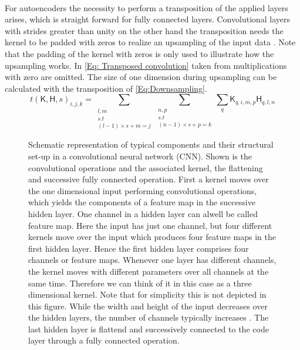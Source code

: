 \\
For autoencoders the necessity to perform a transposition of the applied layers arises, which is straight forward for fully connected layers. Convolutional layers with strides greater than unity on the other hand  the transposition needs the kernel to be padded with zeros to realize an upsampling of the input data \cite{dumoulin2018guide}. Note that the padding of the kernel with zeros is only used to illustrate how the upsampling works. In \cref{Eq: Transposed convolution} taken from \cite{Goodfellow} multiplications with zero are omitted. The size of one dimension during upsampling can be calculated with the transposition of \cref{Eq:Downsampling}.
\begin{equation}\label{Eq: Transposed convolution}
	t(\mathsf{K},\mathsf{H},s)_{i,j,k} = \sum_{\substack{l,m\\s.t\\(l-1)\times s+m=j}}
												  \sum_{\substack{n,p\\s.t\\(n-1)\times s+p=k}}
												  \sum_q \mathsf{K}_{q,i,m,p}\mathsf{H}_{q,l,n} 
\end{equation}
\begin{figure}
	\centering
	
	\label{Fig: Kernel}
	\caption{\footnotesize Schematic representation of typical components and their structural set-up in a convolutional neural network (CNN). Shown is the convolutional operations and the associated kernel, the flattening and successive fully connected operation. First a kernel moves over the one dimensional input performing convolutional operations, which yields the components of a feature map in the successive hidden layer. One channel in a hidden layer can alwell be called feature map. Here the input has just one channel, but four different kernels move over the input which produces four feature maps in the first hidden layer. Hence the first hidden layer comprises four channels or feature maps. Whenever one layer has different channels, the kernel moves with different parameters over all channels at the same time. Therefore we can think of it in this case as a three dimensional kernel. Note that for simplicity this is not depicted in this figure. While the width and height of the input decreases over the hidden layers, the number of channels typically increases . The last hidden layer is flattend and successively connected to the code layer through a fully connected operation.}
\end{figure}
